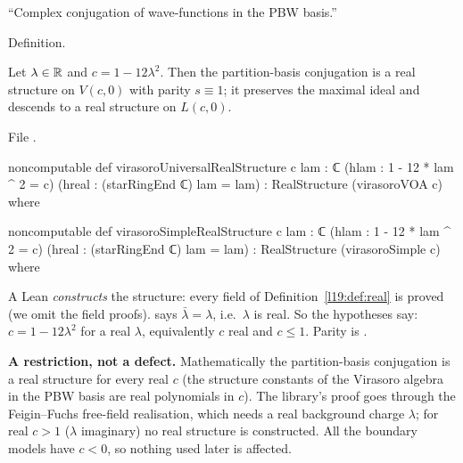 \begin{physics}
``Complex conjugation of wave-functions in the PBW basis.''
\end{physics}

\begin{status}
Definition.
\end{status}

\begin{theorem}\label{l19:thm:virreal}
Let $\lambda\in\mathbb{R}$ and $c = 1-12\lambda^2$. Then the partition-basis conjugation is a real structure on
$V(c,0)$ with parity $s\equiv1$; it preserves the maximal ideal and descends to a real structure on
$L(c,0)$.
\end{theorem}

\noindent File .
\begin{leancode}
noncomputable def virasoroUniversalRealStructure {c lam : ℂ}
    (hlam : 1 - 12 * lam ^ 2 = c) (hreal : (starRingEnd ℂ) lam = lam) :
    RealStructure (virasoroVOA c) where

noncomputable def virasoroSimpleRealStructure {c lam : ℂ}
    (hlam : 1 - 12 * lam ^ 2 = c) (hreal : (starRingEnd ℂ) lam = lam) :
    RealStructure (virasoroSimple c) where
\end{leancode}

\begin{dictionary}
A Lean  \emph{constructs} the structure: every field of
Definition~\ref{l19:def:real} is proved (we omit the field proofs).  says $\bar\lambda =
\lambda$, i.e.\ $\lambda$ is real. So the hypotheses say: $c = 1-12\lambda^2$ for a real $\lambda$,
equivalently $c$ real and $c\le1$. Parity is .

\textbf{A restriction, not a defect.} Mathematically the partition-basis conjugation is a real
structure for every real $c$ (the structure constants of the Virasoro algebra in the PBW basis are real
polynomials in $c$). The library's proof goes through the Feigin--Fuchs free-field realisation, which
needs a real background charge $\lambda$; for real $c>1$ ($\lambda$ imaginary) no real structure is
constructed. All the boundary models have $c<0$, so nothing used later is affected.
\end{dictionary}

